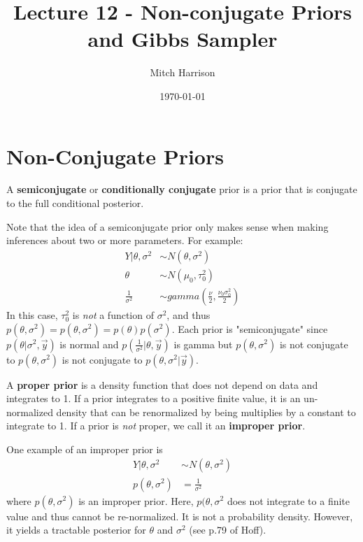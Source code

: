 \documentclass[titlepage, 12pt, leqno]{article}
\title{\Huge{Lecture 12 - Non-conjugate Priors and Gibbs Sampler}}
\author{\large{Mitch Harrison}}
\date{\today}
\begin{document}
\setlength{\parskip}{1\baselineskip}
\setlength{\parindent}{15pt}
\maketitle
\tableofcontents
\newpage


\section{Non-Conjugate Priors}

\begin{definition}
    A \textbf{semiconjugate} or \textbf{conditionally conjugate} prior is a
    prior that is conjugate to the full conditional posterior.
\end{definition}

Note that the idea of a semiconjugate prior only makes sense when making
inferences about two or more parameters. For example:
\begin{align*}
    Y|\theta,\sigma^{2} & \sim N(\theta,\sigma^{2})\\
    \theta & \sim N(\mu_{0}, \tau_{0}^{2}) \\
    \frac{1}{\sigma^{2}} & \sim gamma\left(\frac{\nu}{2},
        \frac{\nu_{0}\sigma_{0}^{2}}{2}\right)
\end{align*}
In this case, $\tau_{0}^{2}$ is \textit{not} a function of $\sigma^{2}$, and
thus $p(\theta, \sigma^{2}) = p(\theta, \sigma^{2}) = p(\theta)p(\sigma^{2})$.
Each prior is "semiconjugate" since $p(\theta|\sigma^{2}, \vec y)$ is normal
and $p(\frac{1}{\sigma^{2}} | \theta, \vec y)$ is gamma but $p(\theta,
\sigma^{2})$ is not conjugate to $p(\theta, \sigma^{2})$ is not conjugate to
$p(\theta,\sigma^{2}|\vec y)$.

\begin{definition}
    A \textbf{proper prior} is a density function that does not depend on data
    and integrates to 1. If a prior integrates to a positive finite value, it
    is an un-normalized density that can be renormalized by being multiplies by
    a constant to integrate to 1. If a prior is \textit{not} proper, we call it
    an \textbf{improper prior}.
\end{definition}
One example of an improper prior is
\begin{align*}
    Y|\theta,\sigma^{2} & \sim N(\theta, \sigma^{2})\\
    p(\theta,\sigma^{2}) &= \frac{1}{\sigma^{2}}
\end{align*}
where $p(\theta, \sigma^{2})$ is an improper prior. Here, $p(\theta, 
\sigma^{2}$ does not integrate to a finite value and thus cannot be 
re-normalized. It is not a probability density. However, it yields a tractable
posterior for $\theta$ and $\sigma^{2}$ (see p.79 of Hoff).
\end{document}
